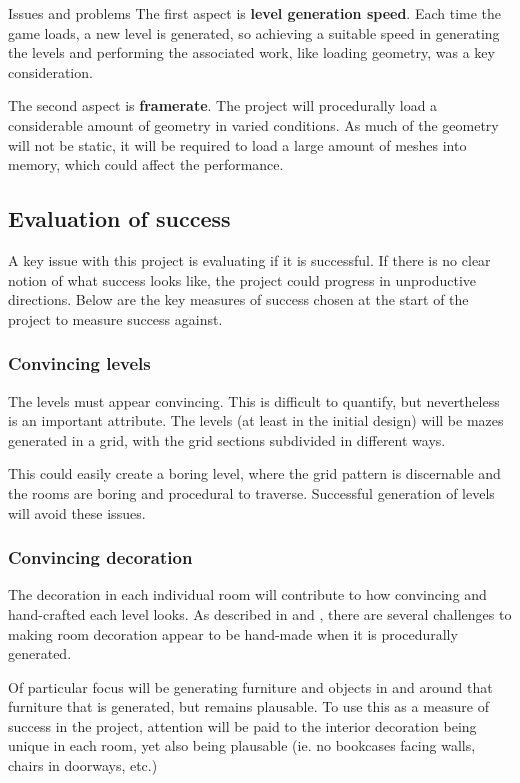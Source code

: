 \documentclass[progress]{cmpreport}
\begin{document}
\begin{section}{Issues and problems}
The first aspect is \textbf{level generation speed}. Each time the game loads, a new level is generated, so achieving a suitable speed in generating the levels and performing the associated work, like loading geometry, was a key consideration.

The second aspect is \textbf{framerate}. The project will procedurally load a considerable amount of geometry in varied conditions. As much of the geometry will not be static, it will be required to load a large amount of meshes into memory, which could affect the performance.  

\subsection{Evaluation of success} \label{evalsuccess}
A key issue with this project is evaluating if it is successful. If there is no clear notion of what success looks like, the project could progress in unproductive directions. Below are the key measures of success chosen at the start of the project to measure success against.

\subsubsection{Convincing levels}
The levels must appear convincing. This is difficult to quantify, but nevertheless is an important attribute. The levels (at least in the initial design) will be mazes generated in a grid, with the grid sections subdivided in different ways.

This could easily create a boring level, where the grid pattern is discernable and the rooms are boring and procedural to traverse. Successful generation of levels will avoid these issues.

\subsubsection{Convincing decoration}
The decoration in each individual room will contribute to how convincing and hand-crafted each level looks. As described in \cite{doi:10.1111/j.1467-8659.2009.01351.x} and \cite{taylor-parberry}, there are several challenges to making room decoration appear to be hand-made when it is procedurally generated. 

Of particular focus will be generating furniture and objects in and around that furniture that is generated, but remains plausable. To use this as a measure of success in the project, attention will be paid to the interior decoration being unique in each room, yet also being plausable (ie. no bookcases facing walls, chairs in doorways, etc.)


\end{section}
\end{document}
